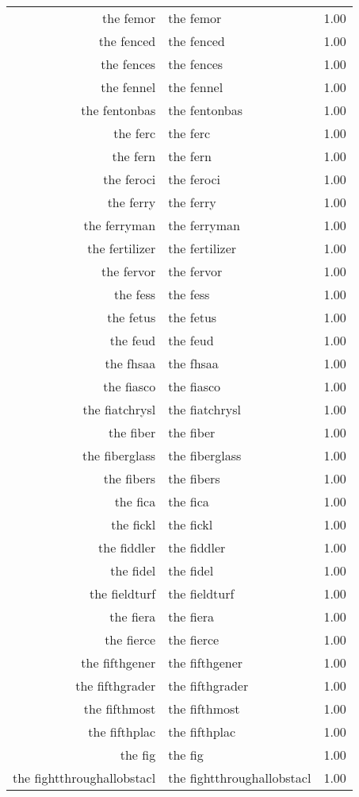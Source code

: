 \begin{table}[ht]
\begin{tabular}{rlr}
  the femor & the femor & 1.00 \\ 
  the fenced & the fenced & 1.00 \\ 
  the fences & the fences & 1.00 \\ 
  the fennel & the fennel & 1.00 \\ 
  the fentonbas & the fentonbas & 1.00 \\ 
  the ferc & the ferc & 1.00 \\ 
  the fern & the fern & 1.00 \\ 
  the feroci & the feroci & 1.00 \\ 
  the ferry & the ferry & 1.00 \\ 
  the ferryman & the ferryman & 1.00 \\ 
  the fertilizer & the fertilizer & 1.00 \\ 
  the fervor & the fervor & 1.00 \\ 
  the fess & the fess & 1.00 \\ 
  the fetus & the fetus & 1.00 \\ 
  the feud & the feud & 1.00 \\ 
  the fhsaa & the fhsaa & 1.00 \\ 
  the fiasco & the fiasco & 1.00 \\ 
  the fiatchrysl & the fiatchrysl & 1.00 \\ 
  the fiber & the fiber & 1.00 \\ 
  the fiberglass & the fiberglass & 1.00 \\ 
  the fibers & the fibers & 1.00 \\ 
  the fica & the fica & 1.00 \\ 
  the fickl & the fickl & 1.00 \\ 
  the fiddler & the fiddler & 1.00 \\ 
  the fidel & the fidel & 1.00 \\ 
  the fieldturf & the fieldturf & 1.00 \\ 
  the fiera & the fiera & 1.00 \\ 
  the fierce & the fierce & 1.00 \\ 
  the fifthgener & the fifthgener & 1.00 \\ 
  the fifthgrader & the fifthgrader & 1.00 \\ 
  the fifthmost & the fifthmost & 1.00 \\ 
  the fifthplac & the fifthplac & 1.00 \\ 
  the fig & the fig & 1.00 \\ 
  the fightthroughallobstacl & the fightthroughallobstacl & 1.00 \\ 

\end{tabular}
\end{table}
